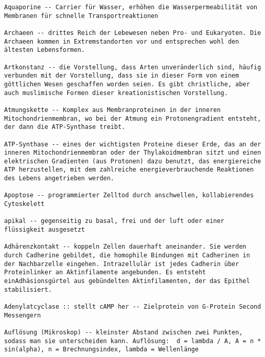\documentclass{article}
\begin{document}
\begin{verbatim}
Aquaporine -- Carrier für Wasser, erhöhen die Wasserpermeabilität von Membranen für schnelle Transportreaktionen

Archaeen -- drittes Reich der Lebewesen neben Pro- und Eukaryoten. Die Archaeen kommen in Extremstandorten vor und entsprechen wohl den ältesten Lebensformen.

Artkonstanz -- die Vorstellung, dass Arten unveränderlich sind, häufig verbunden mit der Vorstellung, dass sie in dieser Form von einem göttlichen Wesen geschaffen worden seien. Es gibt christliche, aber auch muslimische Formen dieser kreationistischen Vorstellung.

Atmungskette -- Komplex aus Membranproteinen in der inneren Mitochondrienmembran, wo bei der Atmung ein Protonengradient entsteht, der dann die ATP-Synthase treibt.

ATP-Synthase -- eines der wichtigsten Proteine dieser Erde, das an der inneren Mitochondrienmembran oder der Thylakoidmembran sitzt und einen elektrischen Gradienten (aus Protonen) dazu benutzt, das energiereiche ATP herzustellen, mit dem zahlreiche energieverbrauchende Reaktionen des Lebens angetrieben werden.
    
Apoptose -- programmierter Zelltod durch anschwellen, kollabierendes Cytoskelett    

apikal -- gegenseitig zu basal, frei und der luft oder einer flüssigkeit ausgesetzt

Adhärenzkontakt -- koppeln Zellen dauerhaft aneinander. Sie werden durch Cadherine gebildet, die homophile Bindungen mit Cadherinen in der Nachbarzelle eingehen. Intrazellulär ist jedes Cadherin über Proteinlinker an Aktinfilamente angebunden. Es entsteht einAdhäsionsgürtel aus gebündelten Aktinfilamenten, der das Epithel stabilisiert.

Adenylatcyclase :: stellt cAMP her -- Zielprotein von G-Protein Second Messengern

Auflösung (Mikroskop) -- kleinster Abstand zwischen zwei Punkten, sodass man sie unterscheiden kann. Auflösung:  d = lambda / A, A = n * sin(alpha), n = Brechnungsindex, lambda = Wellenlänge
    
\end{verbatim}
\newpage
\end{document}
